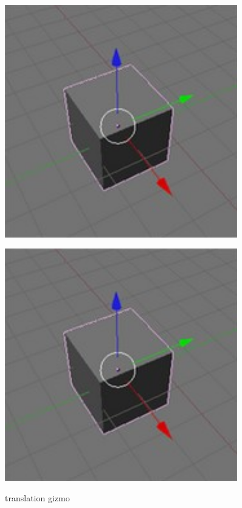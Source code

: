\begin{figure}[htbp]
  \begin{minipage}{.5\textwidth}
    \centering
    \includegraphics[width=0.9\textwidth]{../assets/Manual-Manipulators-Translate.jpg}
  	\caption{translation gizmo \cite{blenderwiki}}
    \label{blender1}
  \end{minipage}
  \begin{minipage}{.5\textwidth}
    \centering
    \includegraphics[width=0.9\textwidth]{../assets/Manual-Manipulators-Translate.jpg}\\

\end{minipage}
\end{figure}
